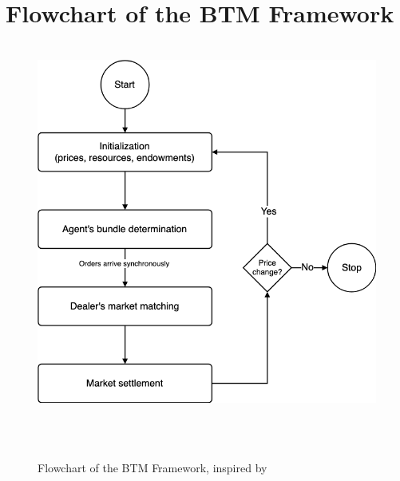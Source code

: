 \section{Flowchart of the BTM Framework}
\label{appendix:flowchart_btm}

\begin{figure}[htbp]
    \centering
    \includegraphics[width=0.8\linewidth]{./figures/btm_flowchart.png}
    \caption{Flowchart of the BTM Framework, inspired by \protect{}}
    \label{figure:btm_flowchart}
\end{figure}

\clearpage